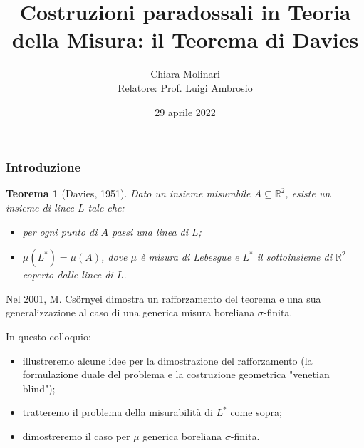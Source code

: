 \documentclass[11pt]{beamer} %
\author[Chiara Molinari]{Chiara Molinari\\[10mm] Relatore: Prof. Luigi Ambrosio}
\title[Il Teorema di Davies]{Costruzioni paradossali in Teoria della Misura: il Teorema di Davies}
\date{29 aprile 2022}
\newcommand{\R}{\mathbb{R}}
\newcommand{\<}{\langle}
\renewcommand{\>}{\rangle}
\theoremstyle{theorem}
\newtheorem{teo}{Teorema}
\theoremstyle{theorem}
\theoremstyle{theorem}
\theoremstyle{theorem}
\theoremstyle{theorem}
\begin{document}

\begin{frame}
	\maketitle
\end{frame}


\begin{frame}[fragile]
	\frametitle{Introduzione}
	\begin{teo}[Davies, 1951] Dato un insieme misurabile $A \subseteq \R^2$, esiste un insieme di linee $L$ tale che:\\
	\begin{itemize}	
	\item per ogni punto di $A$ passi una linea di $L$;\\
	\item $\mu(L^*)=\mu(A)$, dove $\mu$ è misura di Lebesgue e $L^*$ il sottoinsieme di $\R^2$ coperto dalle linee di $L$.
	\end{itemize}
	\end{teo}
	\pause
	
	Nel 2001, M. Cs{\"o}rnyei dimostra un rafforzamento del teorema e una sua generalizzazione al caso di una generica misura boreliana $\sigma$-finita. 
	\pause
	\medskip
	 
	In questo colloquio:\\
	\begin{itemize}
		\item illustreremo alcune idee per la dimostrazione del rafforzamento (la formulazione duale del problema e la costruzione geometrica "venetian blind");\\ \pause
		\item tratteremo il problema della misurabilità di $L^*$ come sopra;\\ \pause
		\item dimostreremo il caso per $\mu$ generica boreliana $\sigma$-finita. \pause
	\end{itemize}

\end{frame}
	
	
	
	
\end{document}
